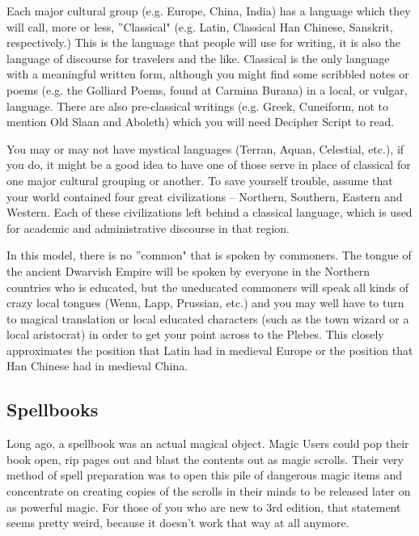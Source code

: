 Each major cultural group (e.g. Europe, China, India) has a language which they will call, more or less, ''Classical" (e.g. Latin, Classical Han Chinese, Sanskrit, respectively.) This is the language that people will use for writing, it is also the language of discourse for travelers and the like. Classical is the only language with a meaningful written form, although you might find some scribbled notes or poems (e.g. the Golliard Poems, found at Carmina Burana) in a local, or vulgar, language. There are also pre-classical writings (e.g. Greek, Cuneiform, not to mention Old Slaan and Aboleth) which you will need Decipher Script to read.

You may or may not have mystical languages (Terran, Aquan, Celestial, etc.), if you do, it might be a good idea to have one of those serve in place of classical for one major cultural grouping or another. To save yourself trouble, assume that your world contained four great civilizations -- Northern, Southern, Eastern and Western. Each of these civilizations left behind a classical language, which is used for academic and administrative discourse in that region.

In this model, there is no ''common" that is spoken by commoners. The tongue of the ancient Dwarvish Empire will be spoken by everyone in the Northern countries who is educated, but the uneducated commoners will speak all kinds of crazy local tongues (Wenn, Lapp, Prussian, etc.) and you may well have to turn to magical translation or local educated characters (such as the town wizard or a local aristocrat) in order to get your point across to the Plebes. This closely approximates the position that Latin had in medieval Europe or the position that Han Chinese had in medieval China.

\subsection{Spellbooks}
\vspace*{-8pt}

Long ago, a spellbook was an actual magical object. Magic Users could pop their book open, rip pages out and blast the contents out as magic scrolls. Their very method of spell preparation was to open this pile of dangerous magic items and concentrate on creating copies of the scrolls in their minds to be released later on as powerful magic. For those of you who are new to 3rd edition, that statement seems pretty weird, because it doesn't work that way at all anymore.

